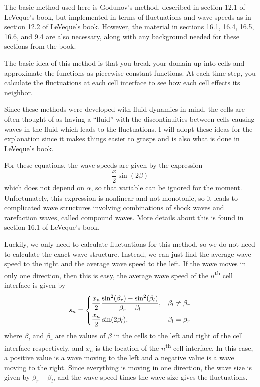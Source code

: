 \documentclass[12pt]{article}
\begin{document}
The basic method used here is Godunov's method, described in section 12.1 of LeVeque's
book, but implemented in terms of fluctuations and wave speeds as in section 12.2 of
LeVeque's book. However, the material in sections 16.1, 16.4, 16.5, 16.6, and 9.4 are
also necessary, along with any background needed for these sections from the book.

The basic idea of this method is that you break your domain up into cells and
approximate the functions as piecewise constant functions. At each time step, you
calculate the fluctuations at each cell interface to see how each cell effects its
neighbor.

Since these methods were developed with fluid dynamics in mind, the cells are often
thought of as having a ``fluid'' with the discontinuities between cells causing waves in
the fluid which leads to the fluctuations. I will adopt these ideas for the explanation
since it makes things easier to grasps and is also what is done in LeVeque's book.

For these equations, the wave speeds are given by the expression
\[ \frac{x}{2}\sin(2\beta) \]
which does not depend on $\alpha$, so that variable can be ignored for the moment.
Unfortunately, this expression is nonlinear and not monotonic, so it leads to
complicated wave structures involving combinations of shock waves and rarefaction waves,
called compound waves. More details about this is found in section 16.1 of LeVeque's
book.

Luckily, we only need to calculate fluctuations for this method, so we do not need to
calculate the exact wave structure. Instead, we can just find the average wave speed to
the right and the average wave speed to the left. If the wave moves in only one
direction, then this is easy, the average wave speed of the $n$\textsuperscript{th} cell
interface is given by
\begin{equation} \label{eq:sn}
    s_n = \begin{dcases}
        \frac{x_n}{2}\frac{\sin^2(\beta_r) - \sin^2(\beta_l)}{\beta_r - \beta_l}, &
        \beta_l \ne \beta_r \\
        \frac{x_n}{2} \sin(2\beta_l), & \beta_l = \beta_r
    \end{dcases}
\end{equation}
where $\beta_l$ and $\beta_r$ are the values of $\beta$ in the cells to the left and
right of the cell interface respectively, and $x_n$ is the location of the
$n$\textsuperscript{th} cell interface. In this case, a positive value is a wave moving
to the left and a negative value is a wave moving to the right. Since everything is
moving in one direction, the wave size is given by $\beta_r - \beta_l$, and the wave
speed times the wave size gives the fluctuations.
\end{document}
